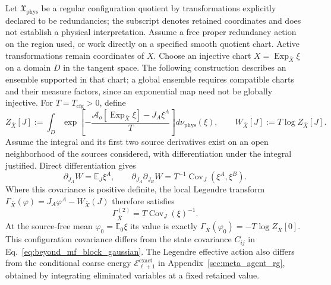 Let $\mathfrak X_{\mathrm{phys}}$ be a regular configuration quotient by transformations explicitly declared to be redundancies; the subscript denotes retained coordinates and does not establish a physical interpretation. Assume a free proper redundancy action on the region used, or work directly on a specified smooth quotient chart. Active transformations remain coordinates of $X$. Choose an injective chart $X=\operatorname{Exp}_{\bar X}\xi$ on a domain $D$ in the tangent space. The following construction describes an ensemble supported in that chart; a global ensemble requires compatible charts and their measure factors, since an exponential map need not be globally injective. For $T=T_{\mathrm{cfg}}>0$, define
\begin{equation}
Z_{\bar X}[J]
:=\int_D
\exp\left[-\frac{\mathcal A_o[\operatorname{Exp}_{\bar X}\xi]-J_A\xi^A}{T}\right]
d\nu_{\mathrm{phys}}(\xi),
\qquad
W_{\bar X}[J]:=T\log Z_{\bar X}[J].
\label{eq:beyond_mf_generating_functional}
\end{equation}
Assume the integral and its first two source derivatives exist on an open neighborhood of the sources considered, with differentiation under the integral justified. Direct differentiation gives
\[
\partial_{J_A}W=\mathbb E_J\xi^A,\qquad
\partial_{J_A}\partial_{J_B}W
=T^{-1}\operatorname{Cov}_J(\xi^A,\xi^B).
\]
Where this covariance is positive definite, the local Legendre transform
$\Gamma_{\bar X}(\varphi)=J_A\varphi^A-W_{\bar X}(J)$ therefore satisfies
\[
\Gamma_{\bar X}^{(2)}
=T\operatorname{Cov}_J(\xi)^{-1}.
\]
At the source-free mean $\varphi_0=\mathbb E_0\xi$ its value is exactly
$\Gamma_{\bar X}(\varphi_0)=-T\log Z_{\bar X}[0]$.
This configuration covariance differs from the state covariance $C_{ij}$ in Eq.~\eqref{eq:beyond_mf_block_gaussian}. The Legendre effective action also differs from the conditional coarse energy $\mathcal E^{\mathrm{exact}}_{\ell+1}$ in Appendix~\ref{sec:meta_agent_rg}, obtained by integrating eliminated variables at a fixed retained value.

